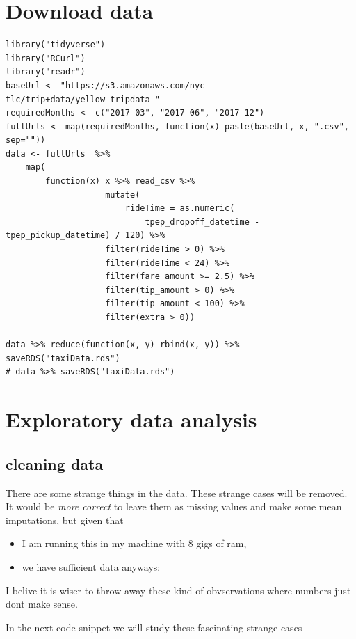 \documentclass[11pt]{article}
\author{joaquin}
\date{\today}
\title{}
\begin{document}
\tableofcontents



\section{Download data}
\label{sec:org57ec86b}

\begin{verbatim}
library("tidyverse")
library("RCurl")
library("readr")
baseUrl <- "https://s3.amazonaws.com/nyc-tlc/trip+data/yellow_tripdata_"
requiredMonths <- c("2017-03", "2017-06", "2017-12")
fullUrls <- map(requiredMonths, function(x) paste(baseUrl, x, ".csv", sep=""))
data <- fullUrls  %>%
    map(
        function(x) x %>% read_csv %>% 
                    mutate(
                        rideTime = as.numeric(
                            tpep_dropoff_datetime - tpep_pickup_datetime) / 120) %>%
                    filter(rideTime > 0) %>%
                    filter(rideTime < 24) %>%
                    filter(fare_amount >= 2.5) %>%
                    filter(tip_amount > 0) %>%
                    filter(tip_amount < 100) %>%
                    filter(extra > 0))

data %>% reduce(function(x, y) rbind(x, y)) %>% saveRDS("taxiData.rds")
# data %>% saveRDS("taxiData.rds")
\end{verbatim}



\section{Exploratory data analysis}
\label{sec:org0f5ccff}
\subsection{cleaning data}
\label{sec:orgf1d5ade}
There are some strange things in the data. These strange cases will be removed.
It would be \emph{more correct} to leave them as missing values and make some mean
imputations, but given that
\begin{itemize}
\item I am running this in my machine with 8 gigs of ram,
\item we have sufficient data anyways:
\end{itemize}
I belive it is wiser to throw away these kind of obvservations where numbers just dont
make sense.

In the next code snippet we will study these fascinating strange cases
\end{document}
